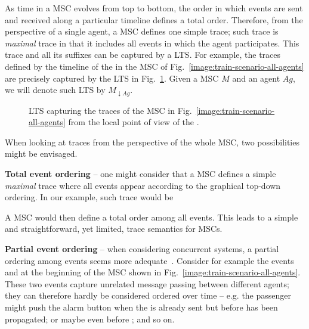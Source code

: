 As time in a MSC evolves from top to bottom, the order in which events are sent and received along a particular timeline defines a total order. Therefore, from the perspective of a single agent, a MSC defines one simple trace; such trace is \emph{maximal} trace in that it includes all events in which the agent participates. This trace and all its suffixes can be captured by a LTS. For example, the traces defined by the timeline of the  in the MSC of Fig.~\ref{image:train-scenario-all-agents} are precisely captured by the LTS in Fig.~\ref{image:local-traces-lts}. Given a MSC $M$ and an agent $Ag$, we will denote such LTS by $M_{\downarrow Ag}$.

\vspace{0.5cm}
\begin{figure}[H]\centering
{}
\caption{LTS capturing the traces of the MSC in Fig.~\ref{image:train-scenario-all-agents} from the local point of view of the .\label{image:local-traces-lts}}
\end{figure}

When looking at traces from the perspective of the whole MSC, two possibilities might be envisaged.

\noindent \textbf{Total event ordering} -- one might consider that a MSC defines a simple \emph{maximal} trace where all events appear according to the graphical top-down ordering. In our example, such trace would be

\begin{center}\end{center} 

A MSC would then define a total order among all events. This leads to a simple and straightforward, yet limited, trace semantics for MSCs.

\noindent \textbf{Partial event ordering} -- when considering concurrent systems, a partial ordering among events seems more adequate~\cite{ITU:1996, Uchitel:2003}. Consider for example the events  and  at the beginning of the MSC shown in Fig.~\ref{image:train-scenario-all-agents}. These two events capture unrelated message passing between different agents; they can therefore hardly be considered ordered over time -- e.g. the passenger might push the alarm button when the  is already sent but before  has been propagated; or maybe even before ; and so on. 


